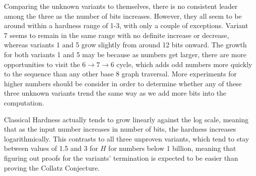 Comparing the unknown variants to themselves, there is no consistent leader among the three as the number of bits increases. However, they all seem to be around within a hardness range of 1-3, with only a couple of exceptions. Variant 7 seems to remain in the same range with no definite increase or decrease, whereas variants 1 and 5 grow slightly from around 12 bits onward. The growth for both variants 1 and 5 may be because as numbers get larger, there are more opportunities to visit the $6 \rightarrow 7 \rightarrow 6$ cycle, which adds odd numbers more quickly to the sequence than any other base 8 graph traversal. More experiments for higher numbers should be consider in order to determine whether any of these three unknown variants trend the same way as we add more bits into the computation.\par
Classical Hardness actually tends to grow linearly against the log scale, meaning that as the input number increases in number of bits, the hardness increases logarithmically. This contrasts to all three unproven variants, which tend to stay between values of 1.5 and 3 for $H$ for numbers below 1 billion, meaning that figuring out proofs for the variants' termination is expected to be easier than proving the Collatz Conjecture.
